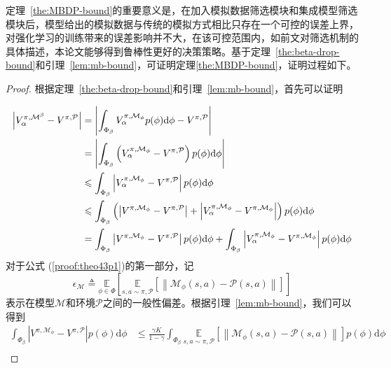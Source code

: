 定理~\ref{the:MBDP-bound}的重要意义是，在加入模拟数据筛选模块和集成模型筛选模块后，模型给出的模拟数据与传统的模拟方式相比只存在一个可控的误差上界，对强化学习的训练带来的误差影响并不大，在该可控范围内，如前文对筛选机制的具体描述，本论文能够得到鲁棒性更好的决策策略。基于定理~\ref{the:beta-drop-bound}和引理~\ref{lem:mb-bound}，可证明定理\ref{the:MBDP-bound}，证明过程如下。

\begin{proof}

根据定理~\ref{the:beta-drop-bound}和引理~\ref{lem:mb-bound}，首先可以证明

\begin{align}
\left|{V}_\alpha^{\pi, \mathcal{M}^\beta}-{V}^{\pi, \mathcal{P}}\right|&=\left|\int_{\Phi_\beta}{V}_\alpha^{\pi, \mathcal{M}_{\phi}}p(\phi)\mathrm{d}\phi-{V}^{\pi, \mathcal{P}}\right| \notag\\
&=\left|\int_{\Phi_\beta}\left({V}_\alpha^{\pi, \mathcal{M}_{\phi}}-{V}^{\pi, \mathcal{P}}\right)p(\phi)\mathrm{d}\phi\right| \notag\\
&\leq\int_{\Phi_\beta}\left|{V}_\alpha^{\pi, \mathcal{M}_{\phi}}-{V}^{\pi, \mathcal{P}}\right|p(\phi)\mathrm{d}\phi\\
&\leq\int_{\Phi_\beta}\left(\left|{V}^{\pi, \mathcal{M}_{\phi}}-{V}^{\pi, \mathcal{P}}\right|+\left|{V}_\alpha^{\pi, \mathcal{M}_{\phi}} - {V}^{\pi,\mathcal{M}_{\phi}}\right|\right)p(\phi)\mathrm{d}\phi\\
&= \int_{\Phi_\beta}\left|{V}^{\pi, \mathcal{M}_{\phi}}-{V}^{\pi, \mathcal{P}}\right|p(\phi)\mathrm{d}\phi+\int_{\Phi_\beta}\left|{V}_\alpha^{\pi, \mathcal{M}_{\phi}} - {V}^{\pi,\mathcal{M}_{\phi}}\right|p(\phi)\mathrm{d}\phi \label{proof:theo43p1}
\end{align}
对于公式 (\ref{proof:theo43p1})的第一部分，记
\begin{equation}
    \epsilon_{\mathcal{M}}\triangleq\underset{\phi\in\Phi}{\mathbb{E}}\left[\underset{s,a\sim \pi,\mathcal{P}}{\mathbb{E}}\left[\left\|\mathcal{M}_\phi(s, a)-\mathcal{P}(s, a)\right\|\right]\right]
\end{equation}
表示在模型$\mathcal{M}$和环境$\mathcal{P}$之间的一般性偏差。根据引理~\ref{lem:mb-bound}，我们可以得到
\begin{align}
\int_{\Phi_\beta}\left|{V}^{\pi, \mathcal{M}_{\phi}}-{V}^{\pi, \mathcal{P}}\right|p(\phi)\mathrm{d}\phi &\leq \frac{\gamma K}{1-\gamma}\int_{\Phi_\beta}\underset{s,a\sim\pi,\mathcal{P}}{\mathbb{E}}\left[\left\|\mathcal{M}_\phi(s, a)-\mathcal{P}(s, a)\right\|\right]p(\phi)\mathrm{d}\phi\\

\end{align}
\end{proof}
